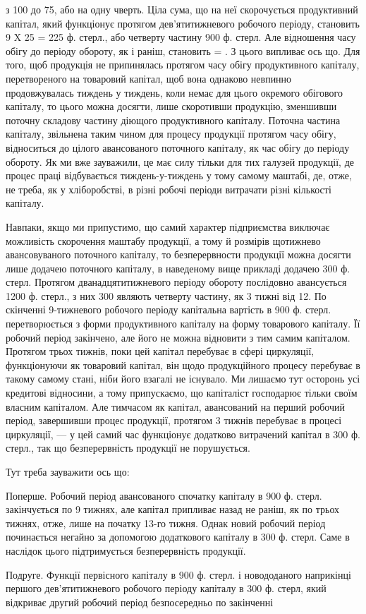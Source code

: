 \parcont{}  %
з 100 до 75, або на одну чверть. Ціла сума, що на неї скорочується
продуктивний капітал, який функціонує протягом дев’ятитижневого робочого
періоду, становить 9 X 25 = 225 ф. стерл., або четверту частину
900 ф. стерл. Але відношення часу обігу до періоду обороту, як і раніш,
становить  = . З цього випливає ось що. Для того, щоб продукція
не припинялась протягом часу обігу продуктивного капіталу, перетвореного
на товаровий капітал, щоб вона однаково невпинно продовжувалась тиждень
у тиждень, коли немає для цього окремого обігового капіталу, то
цього можна досягти, лише скоротивши продукцію, зменшивши поточну
складову частину діющого продуктивного капіталу. Поточна частина капіталу,
звільнена таким чином для процесу продукції протягом часу обігу,
відноситься до цілого авансованого поточного капіталу, як час обігу до
періоду обороту. Як ми вже зауважили, це має силу тільки для тих галузей
продукції, де процес праці відбувається тиждень-у-тиждень у
тому самому маштабі, де, отже, не треба, як у хліборобстві, в різні робочі
періоди витрачати різні кількості капіталу.

Навпаки, якщо ми припустимо, що самий характер підприємства виключає
можливість скорочення маштабу продукції, а тому й розмірів щотижнево
авансовуваного поточного капіталу, то безперервности продукції
можна досягти лише додачею поточного капіталу, в наведеному вище
прикладі додачею 300 ф. стерл. Протягом дванадцятитижневого періоду
обороту послідовно авансується 1200 ф. стерл., з них 300 являють четверту
частину, як 3 тижні від 12. По скінченні 9-тижневого робочого
періоду капітальна вартість в 900 ф. стерл. перетворюється з форми
продуктивного капіталу на форму товарового капіталу. Її робочий період
закінчено, але його не можна відновити з тим самим капіталом. Протягом
трьох тижнів, поки цей капітал перебуває в сфері циркуляції, функціонуючи
як товаровий капітал, він щодо продукційного процесу перебуває
в такому самому стані, ніби його взагалі не існувало. Ми лишаємо тут
осторонь усі кредитові відносини, а тому припускаємо, що капіталіст
господарює тільки своїм власним капіталом. Але тимчасом як капітал,
авансований на перший робочий період, завершивши процес продукції,
протягом 3 тижнів перебуває в процесі циркуляції, — у цей самий час
функціонує додатково витрачений капітал в 300 ф. стерл., так що безперервність
продукції не порушується.

Тут треба зауважити ось що:

Поперше. Робочий період авансованого спочатку капіталу в 900 ф.
стерл. закінчується по 9 тижнях, але капітал припливає назад не раніш,
як по трьох тижнях, отже, лише на початку 13-го тижня. Однак новий
робочий період починається негайно за допомогою додаткового капіталу
в 300 ф. стерл. Саме в наслідок цього підтримується безперервність
продукції.

Подруге. Функції первісного капіталу в 900 ф. стерл. і новододаного
наприкінці першого дев’ятитижневого робочого періоду капіталу в 300 ф.
стерл, який відкриває другий робочий період безпосередньо по закінченні
\parbreak{}  %

